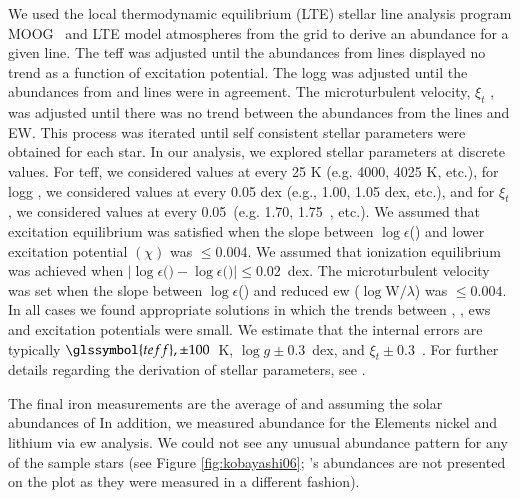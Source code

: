 We used the local thermodynamic equilibrium (LTE) stellar line analysis program MOOG \citemoog\ and LTE model atmospheres from the \citet{2003IAUS..210P.A20C} grid to derive an abundance for a given line. The \gls{teff} was adjusted until the abundances from  lines displayed no trend as a function of excitation potential. The \gls{logg} was adjusted until the abundances from  and  lines were in agreement. The microturbulent velocity, $\xi _{t}$ , was adjusted until there was no trend between the abundances from the  lines and EW. This process was iterated until self consistent stellar parameters were obtained  for each star. In our analysis, we explored stellar parameters at discrete values. For \gls{teff}, we considered values at every 25 K (e.g. 4000, 4025 K, etc.), for \gls{logg} , we considered values at every 0.05 dex (e.g., 1.00, 1.05 dex, etc.), and for $\xi _{t}$ , we considered values at every 0.05~\kms (e.g. 1.70, 1.75~\kms, etc.). We assumed that excitation equilibrium was satisfied when the slope between $\log{\epsilon}$() and lower excitation potential $(\chi)$ was $\leq0.004$. We assumed that ionization equilibrium was achieved when $\vert\log{\epsilon} ($$) - \log{\epsilon} ($$)\vert \leq 0.02$~dex. The microturbulent velocity was set when the slope between $\log{\epsilon}$() and reduced \gls{ew} ($\log{\textrm{W}}/\lambda$) was $\leq0.004$. In all cases we found appropriate solutions in which the trends between , , \glspl{ew} and excitation potentials were small. We estimate that the internal errors are typically $\glssymbol{teff}, \pm100$~K, $\log{g}\pm0.3$~dex, and $\xi _{t}\pm0.3$~\kms. For further details regarding the derivation of stellar parameters, see \citet{2008ApJ...673..854Y}.

The final iron measurements are the average of  and  assuming the solar abundances of \citet{2009ARA&A..47..481A} 
In addition, we measured abundance for the Elements nickel and lithium via \gls{ew} analysis. We could not see any unusual abundance pattern for any of the sample stars (see Figure \ref{fig:kobayashi06}; \starb's abundances are not presented on the plot as they were measured in a different fashion).  



